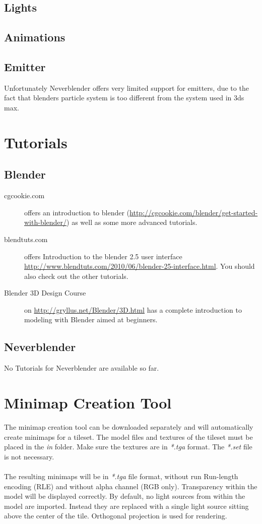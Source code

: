 \documentclass[a4paper]{article}
\begin{document}
\subsection{Lights}

\subsection{Animations}

\subsection{Emitter}
Unfortunately Neverblender offers very limited support for emitters, due to the fact that blenders particle system is too different from the system used in 3ds max.
\section{Tutorials}

\subsection{Blender}
\begin{description}
    \item[cgcookie.com] offers an introduction to blender (\url{http://cgcookie.com/blender/get-started-with-blender/}) as well as some more advanced tutorials.
    \item[blendtuts.com] offers Introduction to the blender 2.5 user interface \url{http://www.blendtuts.com/2010/06/blender-25-interface.html}. You should also check out the other tutorials.
    \item[Blender 3D Design Course] on \url{http://gryllus.net/Blender/3D.html} has a complete introduction to modeling with Blender aimed at beginners.
\end{description}

\subsection{Neverblender}
No Tutorials for Neverblender are available so far.

\section{Minimap Creation Tool}
The minimap creation tool can be downloaded separately and will automatically create minimaps for a tileset. The model files and textures of the tileset must be placed in the {\itshape{in}}  folder. Make sure the textures are in {\itshape{*.tga}} format. The {\itshape{*.set}} file is not necessary. \\ \\
The resulting minimaps will be in {\itshape{*.tga}} file format, without run Run-length encoding (RLE) and without alpha channel (RGB only). Transparency within the model will be displayed correctly. By default, no light sources from within the model are imported. Instead they are replaced with a single light source sitting above the center of the tile. Orthogonal projection is used for rendering.
\end{document}
